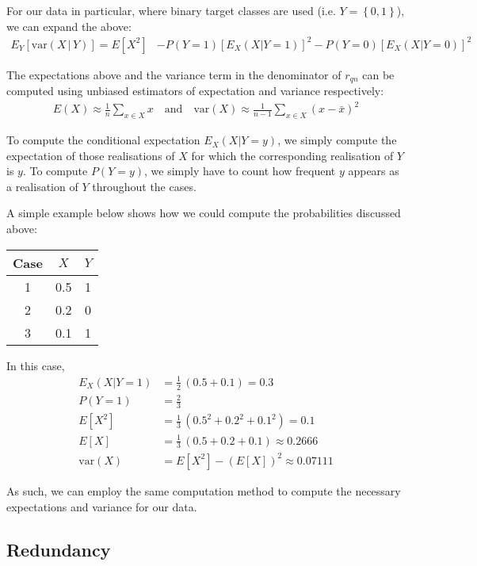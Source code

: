 \documentclass[12pt, twoside, a4paper]{report}
\def\var{\text{var}}
\begin{document}
For our data in particular, where binary target classes are used (i.e. $Y= \left\lbrace 0,1 \right\rbrace$), we can expand the above:
\begin{align*}
E_Y [ \var(X \, | \, Y) ]
= E[X^2] &- P(Y=1) \left[ E_X(X|Y=1) \right]^2 - P(Y=0) \left[ E_X(X|Y=0) \right]^2 
\end{align*}

The expectations above and the variance term in the denominator of $r_{qn}$ can be computed using unbiased estimators of expectation and variance respectively:
\begin{align*}
E(X) \approx \frac{1}{n} \sum_{x \in X} x \quad \text{and} \quad \var(X) \approx \frac{1}{n-1} \sum_{x \in X} (x- \bar{x})^2
\end{align*}

To compute the conditional expectation $E_X(X|Y=y)$, we simply compute the expectation of those realisations of $X$ for which the corresponding realisation of $Y$ is $y$. To compute $P(Y=y)$, we simply have to count how frequent $y$ appears as a realisation of $Y$ throughout the cases.

A simple example below shows how we could compute the probabilities discussed above:

\begin{center}
    \begin{tabular}{| c || c | c |}
    \hline
     Case & $X$ & $Y$ \\ \hline \hline
     1 & 0.5 & 1 \\ \hline
     2 & 0.2 & 0 \\ \hline
     3 & 0.1 & 1 \\ \hline
    \end{tabular}
\end{center}

In this case,
\begin{align*}
E_X(X|Y=1) &= \frac{1}{2} \,  (0.5+0.1) = 0.3 \\
P(Y=1) &= \frac{2}{3} \\
E[X^2] &= \frac{1}{3} \, (0.5^2+0.2^2+0.1^2) = 0.1 \\
E[X] &= \frac{1}{3} \, (0.5+0.2+0.1) \approx 0.2666 \\
\var(X) &= E[X^2] - (E[X])^2 \approx 0.07111
\end{align*}

As such, we can employ the same computation method to compute the necessary expectations and variance for our data.

\subsection{Redundancy}
\end{document}
